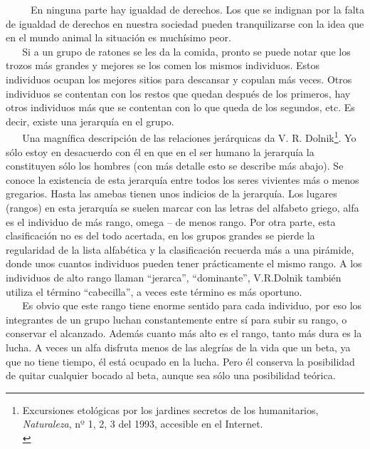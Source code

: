 ~ ~ ~ En ninguna parte hay igualdad de derechos. Los que se indignan por
la falta de igualdad de derechos en nuestra sociedad pueden
tranquilizarse con la idea que en el mundo animal la situación es
muchísimo peor.\\
\hspace*{0.333em} ~ ~ Si a un grupo de ratones se les da la comida,
pronto se puede notar que los trozos más grandes y mejores se los comen
los mismos individuos. Estos individuos ocupan los mejores sitios para
descansar y copulan más veces. Otros individuos se contentan con los
restos que quedan después de los primeros, hay otros individuos más que
se contentan con lo que queda de los segundos, etc. Es decir, existe una
jerarquía en el grupo.\\
\hspace*{0.333em} ~ ~ Una magnífica descripción de las relaciones
jerárquicas da V. R. Dolnik\footnote{Excursiones etológicas por los
  jardines secretos de los humanitarios, \emph{Naturaleza}, nº 1, 2, 3
  del 1993, accesible en el Internet.\\}.
%
Yo sólo estoy en desacuerdo con él en que en el ser humano la jerarquía
la constituyen sólo los hombres (con más detalle esto se describe más
abajo). Se conoce la existencia de esta jerarquía entre todos los seres
vivientes más o menos gregarios. Hasta las amebas tienen unos indicios
de la jerarquía. Los lugares (rangos) en esta jerarquía se suelen marcar
con las letras del alfabeto griego, alfa es el individuo de más rango,
omega -- de menos rango. Por otra parte, esta clasificación no es del
todo acertada, en los grupos grandes se pierde la regularidad de la
lista alfabética y la clasificación recuerda más a una pirámide, donde
unos cuantos individuos pueden tener prácticamente el mismo rango. A los
individuos de alto rango llaman ``jerarca'', ``dominante'', V.R.Dolnik
también utiliza el término ``cabecilla'', a veces este término es más
oportuno.\\
\hspace*{0.333em} ~ ~ Es obvio que este rango tiene enorme sentido para
cada individuo, por eso los integrantes de un grupo luchan
constantemente entre sí para subir su rango, o conservar el alcanzado.
Además cuanto más alto es el rango, tanto más dura es la lucha. A veces
un alfa disfruta menos de las alegrías de la vida que un beta, ya que no
tiene tiempo, él está ocupado en la lucha. Pero él conserva la
posibilidad de quitar cualquier bocado al beta, aunque sea sólo una
posibilidad teórica.\\
